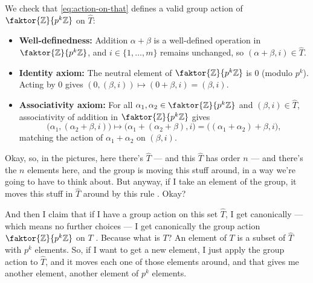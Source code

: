 \begin{proofWrapper}
\begin{content}
\begin{steps}
We check that \eqref{eq:action-on-that} defines a valid group action of $\faktor{\mathbb{Z}}{p^k\mathbb{Z}}$ on $\widehat{T}$:
\begin{itemize}
    \item \textbf{Well-definedness:} Addition $\alpha + \beta$ is a well-defined operation in $\faktor{\mathbb{Z}}{p^k\mathbb{Z}}$, and $i \in \{1, \dots, m\}$ remains unchanged, so $(\alpha + \beta, i) \in \widehat{T}$.
    \item \textbf{Identity axiom:} The neutral element of $\faktor{\mathbb{Z}}{p^k\mathbb{Z}}$ is $0$ (modulo $p^k$). Acting by $0$ gives $(0, (\beta, i)) \longmapsto (0 + \beta, i) = (\beta, i)$.
    \item \textbf{Associativity axiom:} For all $\alpha_1, \alpha_2 \in \faktor{\mathbb{Z}}{p^k\mathbb{Z}}$ and $(\beta, i) \in \widehat{T}$, associativity of addition in $\faktor{\mathbb{Z}}{p^k\mathbb{Z}}$ gives
    \[
    \bigl(\alpha_1, (\alpha_2 + \beta, i)\bigr) \longmapsto \bigl(\alpha_1 + (\alpha_2 + \beta), i\bigr) = \bigl((\alpha_1 + \alpha_2) + \beta, i\bigr),
    \]
    matching the action of $\alpha_1 + \alpha_2$ on $(\beta, i)$.
\end{itemize}
\end{steps}
\end{content}

\begin{speech}[00:34:48 - 00:36:53]
Okay, so, in the pictures, here there's $\widehat{T}$  --- and this $\widehat{T}$ has order $n$ --- and there's the $n$ elements here, and the group is moving this stuff around, in a way we're going to have to think about. But anyway, if I take an element of the group, it moves this stuff in $\widehat{T}$ around by this rule . Okay?

And then I claim that if I have a group action on this set $\widehat{T}$, I get canonically --- which means no further choices --- I get canonically the group action $\faktor{\mathbb{Z}}{p^k\mathbb{Z}}$ on $T$ . Because what is $T$? An element of $T$ is a subset of $\widehat{T}$ with $p^k$ elements. So, if I want to get a new element, I just apply the group action to $\widehat{T}$, and it moves each one of those elements around, and that gives me another element, another element of $p^k$ elements.


\end{speech}
\end{proofWrapper}

